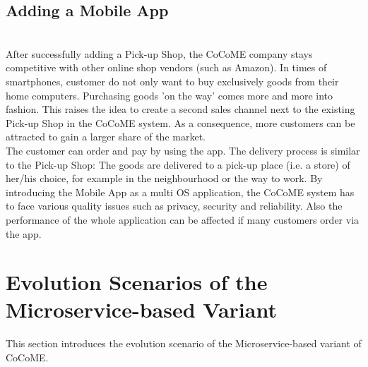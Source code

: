 \subsection{Adding a Mobile App}
~\\After successfully adding a Pick-up Shop, the CoCoME company stays competitive with other online shop vendors (such as Amazon). In times of smartphones, customer do not only want to buy exclusively goods from their home computers. Purchasing goods 'on the way' comes more and more into fashion. This raises the idea to create a second sales channel next to the existing Pick-up Shop in the CoCoME system. As a consequence, more customers can be attracted to gain a larger share of the market. 
\\
The customer can order and pay by using the app. The delivery process is similar to the Pick-up Shop: The goods are delivered to a pick-up place (i.e. a store) of her/his choice, for example in the neighbourhood or the way to work.
By introducing the Mobile App as a multi OS application, the CoCoME system has to face various quality issues such as privacy, security and reliability. Also the performance of the whole application can be affected if many customers order via the app.





\section{Evolution Scenarios of the Microservice-based Variant}
This section introduces the evolution scenario of the Microservice-based variant of CoCoME.
